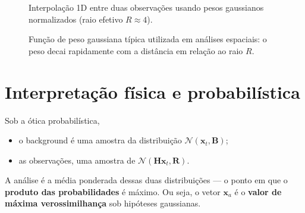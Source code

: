 \begin{figure}[h!]
\centering
{}
\caption{Interpolação 1D entre duas observações usando pesos gaussianos normalizados (raio efetivo \(R\approx4\)).}
\label{fig:interp1d}
\end{figure}

\begin{figure}[h!]
\centering
{}
\caption{Função de peso gaussiana típica utilizada em análises espaciais: o peso decai rapidamente com a distância em relação ao raio \(R\).}
\label{fig:gaussian}
\end{figure}

\section{Interpretação física e probabilística}

Sob a ótica probabilística,  
\begin{itemize}
    \item o background é uma amostra da distribuição \( \mathcal{N}(\mathbf{x}_t, \mathbf{B}) \);
    \item as observações, uma amostra de \( \mathcal{N}(\mathbf{H}\mathbf{x}_t, \mathbf{R}) \).
\end{itemize}
A análise é a média ponderada dessas duas distribuições --- o ponto em que o \textbf{produto das probabilidades} é máximo.  
Ou seja, o vetor \( \mathbf{x}_a \) é o \textbf{valor de máxima verossimilhança} sob hipóteses gaussianas.

